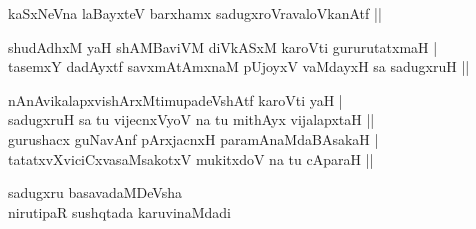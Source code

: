 \begin{entry}
\smallskip
\begin{shl}
kaSxNeVna laBayxteV barxhamx sadugxroVravaloVkanAtf ||
\end{shl}
\smallskip
{}
\smallskip
\begin{shl}
shudAdhxM yaH shAMBaviVM diVkASxM karoVti gururutatxmaH |\\[1pt]
tasemxY dadAyxtf savxmAtAmxnaM pUjoyxV vaMdayxH sa sadugxruH ||
\end{shl}
\medskip
{}
\smallskip
\begin{shl}
nAnAvikalapxvishArxMtimupadeVshAtf karoVti yaH |\\[1pt]
sadugxruH sa tu vijecnxVyoV na tu mithAyx vijalapxtaH ||\\[1pt]
gurushacx guNavAnf pArxjacnxH paramAnaMdaBAsakaH |\\[1pt]
tatatxvXviciCxvasaMsakotxV mukitxdoV na tu cAparaH ||
\end{shl}
\smallskip
{}
\smallskip
\begin{shl}
sadugxru basavadaMDeVsha\\[1pt]
nirutipaR sushqtada karuvinaMdadi
\end{shl}
\smallskip
{}
\smallskip
\end{entry}

